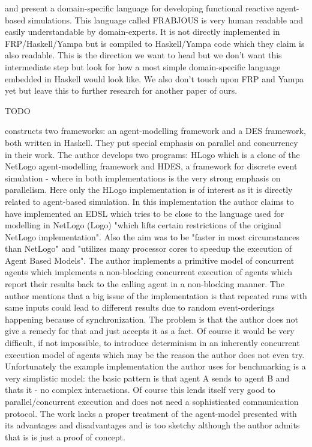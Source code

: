 \cite{schneider_towards_2012} and \cite{vendrov_frabjous:_2014} present a domain-specific language for developing functional reactive agent-based simulations. This language called FRABJOUS is very human readable and easily understandable by domain-experts. It is not directly implemented in FRP/Haskell/Yampa but is compiled to Haskell/Yampa code which they claim is also readable. This is the direction we want to head but we don't want this intermediate step but look for how a most simple domain-specific language embedded in Haskell would look like. We also don't touch upon FRP and Yampa yet but leave this to further research for another paper of ours.

\cite{klugl_amason:_2013} TODO

\cite{bezirgiannis_improving_2013} constructs two frameworks: an agent-modelling framework and a DES framework, both written in Haskell. They put special emphasis on parallel and concurrency in their work. The author develops two programs: HLogo which is a clone of the NetLogo agent-modelling framework and HDES, a framework for discrete event simulation - where in both implementations is the very strong emphasis on parallelism.  Here only the HLogo implementation is of interest as it is directly related to agent-based simulation. In this implementation the author claims to have implemented an EDSL which tries to be close to the language used for modelling in NetLogo (Logo) "which lifts certain restrictions of the original NetLogo implementation". Also the aim was to be "faster in most circumstances than NetLogo" and "utilizes many processor cores to speedup the execution of Agent Based Models". The author implements a primitive model of concurrent agents which implements a non-blocking concurrent execution of agents which report their results back to the calling agent in a non-blocking manner. The author mentions that a big issue of the implementation is that repeated runs with same inputs could lead to different results due to random event-orderings happening because of synchronization. The problem is that the author does not give a remedy for that and just accepts it as a fact. Of course it would be very difficult, if not impossible, to introduce determinism in an inherently concurrent execution model of agents which may be the reason the author does not even try. Unfortunately the example implementation the author uses for benchmarking is a very simplistic model: the basic pattern is that agent A sends to agent B and thats it - no complex interactions. Of course this lends itself very good to parallel/concurrent execution and does not need a sophisticated communication protocol. The work lacks a proper treatment of the agent-model presented with its advantages and disadvantages and is too sketchy although the author admits that is is just a proof of concept. \\

